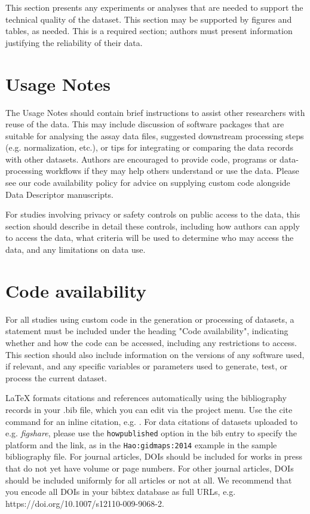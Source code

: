 \documentclass[fleqn,10pt]{wlscirep}
\begin{document}
This section presents any experiments or analyses that are needed to support the
technical quality of the dataset. This section may be supported by figures and tables,
as needed. This is a required section; authors must present information justifying the
reliability of their data.




\section*{Usage Notes}

The Usage Notes should contain brief instructions to assist other researchers with reuse
of the data. This may include discussion of software packages that are suitable for
analysing the assay data files, suggested downstream processing steps (e.g.
normalization, etc.), or tips for integrating or comparing the data records with other
datasets. Authors are encouraged to provide code, programs or data-processing workflows
if they may help others understand or use the data. Please see our code availability
policy for advice on supplying custom code alongside Data Descriptor manuscripts.

For studies involving privacy or safety controls on public access to the data, this
section should describe in detail these controls, including how authors can apply to
access the data, what criteria will be used to determine who may access the data, and
any limitations on data use.



\section*{Code availability}



For all studies using custom code in the generation or processing of datasets, a
statement must be included under the heading "Code availability", indicating whether and
how the code can be accessed, including any restrictions to access. This section should
also include information on the versions of any software used, if relevant, and any
specific variables or parameters used to generate, test, or process the current dataset.



\noindent LaTeX formats citations and references automatically using the bibliography
records in your .bib file, which you can edit via the project menu. Use the cite command
for an inline citation, e.g. \cite{Kaufman2020, Figueredo:2009dg, Babichev2002,
behringer2014manipulating}. For data citations of datasets uploaded to e.g.
\emph{figshare}, please use the \verb|howpublished| option in the bib entry to specify
the platform and the link, as in the \verb|Hao:gidmaps:2014| example in the sample
bibliography file. For journal articles, DOIs should be included for works in press that
do not yet have volume or page numbers. For other journal articles, DOIs should be
included uniformly for all articles or not at all. We recommend that you encode all DOIs
in your bibtex database as full URLs, e.g. https://doi.org/10.1007/s12110-009-9068-2.
\end{document}
